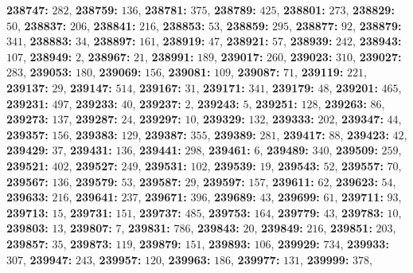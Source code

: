 \textsf{\bfseries 238747:} $282$, \textsf{\bfseries 238759:} $136$, \textsf{\bfseries 238781:} $375$, \textsf{\bfseries 238789:} $425$, \textsf{\bfseries 238801:} $273$, \textsf{\bfseries 238829:} $50$, \textsf{\bfseries 238837:} $206$, \textsf{\bfseries 238841:} $216$, \textsf{\bfseries 238853:} $53$, \textsf{\bfseries 238859:} $295$, \textsf{\bfseries 238877:} $92$, \textsf{\bfseries 238879:} $341$, \textsf{\bfseries 238883:} $34$, \textsf{\bfseries 238897:} $161$, \textsf{\bfseries 238919:} $47$, \textsf{\bfseries 238921:} $57$, \textsf{\bfseries 238939:} $242$, \textsf{\bfseries 238943:} $107$, \textsf{\bfseries 238949:} $2$, \textsf{\bfseries 238967:} $21$, \textsf{\bfseries 238991:} $189$, \textsf{\bfseries 239017:} $260$, \textsf{\bfseries 239023:} $310$, \textsf{\bfseries 239027:} $283$, \textsf{\bfseries 239053:} $180$, \textsf{\bfseries 239069:} $156$, \textsf{\bfseries 239081:} $109$, \textsf{\bfseries 239087:} $71$, \textsf{\bfseries 239119:} $221$, \textsf{\bfseries 239137:} $29$, \textsf{\bfseries 239147:} $514$, \textsf{\bfseries 239167:} $31$, \textsf{\bfseries 239171:} $341$, \textsf{\bfseries 239179:} $48$, \textsf{\bfseries 239201:} $465$, \textsf{\bfseries 239231:} $497$, \textsf{\bfseries 239233:} $40$, \textsf{\bfseries 239237:} $2$, \textsf{\bfseries 239243:} $5$, \textsf{\bfseries 239251:} $128$, \textsf{\bfseries 239263:} $86$, \textsf{\bfseries 239273:} $137$, \textsf{\bfseries 239287:} $24$, \textsf{\bfseries 239297:} $10$, \textsf{\bfseries 239329:} $132$, \textsf{\bfseries 239333:} $202$, \textsf{\bfseries 239347:} $44$, \textsf{\bfseries 239357:} $156$, \textsf{\bfseries 239383:} $129$, \textsf{\bfseries 239387:} $355$, \textsf{\bfseries 239389:} $281$, \textsf{\bfseries 239417:} $88$, \textsf{\bfseries 239423:} $42$, \textsf{\bfseries 239429:} $37$, \textsf{\bfseries 239431:} $136$, \textsf{\bfseries 239441:} $298$, \textsf{\bfseries 239461:} $6$, \textsf{\bfseries 239489:} $340$, \textsf{\bfseries 239509:} $259$, \textsf{\bfseries 239521:} $402$, \textsf{\bfseries 239527:} $249$, \textsf{\bfseries 239531:} $102$, \textsf{\bfseries 239539:} $19$, \textsf{\bfseries 239543:} $52$, \textsf{\bfseries 239557:} $70$, \textsf{\bfseries 239567:} $136$, \textsf{\bfseries 239579:} $53$, \textsf{\bfseries 239587:} $29$, \textsf{\bfseries 239597:} $157$, \textsf{\bfseries 239611:} $62$, \textsf{\bfseries 239623:} $54$, \textsf{\bfseries 239633:} $216$, \textsf{\bfseries 239641:} $237$, \textsf{\bfseries 239671:} $396$, \textsf{\bfseries 239689:} $43$, \textsf{\bfseries 239699:} $61$, \textsf{\bfseries 239711:} $93$, \textsf{\bfseries 239713:} $15$, \textsf{\bfseries 239731:} $151$, \textsf{\bfseries 239737:} $485$, \textsf{\bfseries 239753:} $164$, \textsf{\bfseries 239779:} $43$, \textsf{\bfseries 239783:} $10$, \textsf{\bfseries 239803:} $13$, \textsf{\bfseries 239807:} $7$, \textsf{\bfseries 239831:} $786$, \textsf{\bfseries 239843:} $20$, \textsf{\bfseries 239849:} $216$, \textsf{\bfseries 239851:} $203$, \textsf{\bfseries 239857:} $35$, \textsf{\bfseries 239873:} $119$, \textsf{\bfseries 239879:} $151$, \textsf{\bfseries 239893:} $106$, \textsf{\bfseries 239929:} $734$, \textsf{\bfseries 239933:} $307$, \textsf{\bfseries 239947:} $243$, \textsf{\bfseries 239957:} $120$, \textsf{\bfseries 239963:} $186$, \textsf{\bfseries 239977:} $131$, \textsf{\bfseries 239999:} $378$, 
